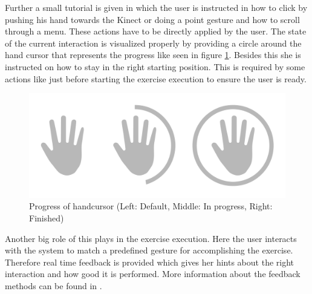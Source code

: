 Further a small tutorial is given in which the user is instructed in how to click by pushing his hand towards the Kinect or doing a point gesture and how to scroll through a menu. These actions have to be directly applied by the user. The state of the current interaction is visualized properly by providing a circle around the hand cursor that represents the progress like seen in figure \ref{fig:handcursorProgress}. Besides this she is instructed on how to stay in the right starting position. This is required by some actions like just before starting the exercise execution to ensure the user is ready.
\begin{figure}[htb]
	\centering
	\begin{minipage}[t]{1\linewidth}
		\centering
		\includegraphics[width=0.6\linewidth]{Pictures/handcursorProgress}
		\caption{Progress of handcursor (Left: Default, Middle: In progress, Right: Finished)}
		\label{fig:handcursorProgress}
	\end{minipage}
\end{figure}

Another big role of this plays in the exercise execution. Here the user interacts with the system to match a predefined gesture for accomplishing the exercise. Therefore real time feedback is provided which gives her hints about the right interaction and how good it is performed. More information about the feedback methods can be found in \textbf{}.

